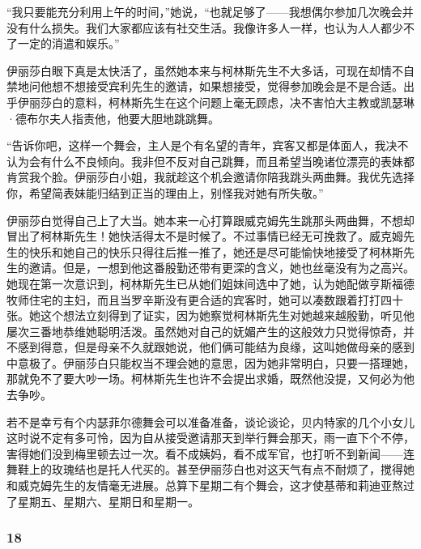 \par “我只要能充分利用上午的时间，”她说，“也就足够了——我想偶尔参加几次晚会并没有什么损失。我们大家都应该有社交生活。我像许多人一样，也认为人人都少不了一定的消遣和娱乐。”
\par 伊丽莎白眼下真是太快活了，虽然她本来与柯林斯先生不大多话，可现在却情不自禁地问他想不想接受宾利先生的邀请，如果想接受，觉得参加晚会是不是合适。出乎伊丽莎白的意料，柯林斯先生在这个问题上毫无顾虑，决不害怕大主教或凯瑟琳·德布尔夫人指责他，他要大胆地跳跳舞。
\par “告诉你吧，这样一个舞会，主人是个有名望的青年，宾客又都是体面人，我决不认为会有什么不良倾向。我非但不反对自己跳舞，而且希望当晚诸位漂亮的表妹都肯赏我个脸。伊丽莎白小姐，我就趁这个机会邀请你陪我跳头两曲舞。我优先选择你，希望简表妹能归结到正当的理由上，别怪我对她有所失敬。”
\par 伊丽莎白觉得自己上了大当。她本来一心打算跟威克姆先生跳那头两曲舞，不想却冒出了柯林斯先生！她快活得太不是时候了。不过事情已经无可挽救了。威克姆先生的快乐和她自己的快乐只得往后推一推了，她还是尽可能愉快地接受了柯林斯先生的邀请。但是，一想到他这番殷勤还带有更深的含义，她也丝毫没有为之高兴。她现在第一次意识到，柯林斯先生已从她们姐妹间选中了她，认为她配做亨斯福德牧师住宅的主妇，而且当罗辛斯没有更合适的宾客时，她可以凑数跟着打打四十张。她这个想法立刻得到了证实，因为她察觉柯林斯先生对她越来越殷勤，听见他屡次三番地恭维她聪明活泼。虽然她对自己的妩媚产生的这般效力只觉得惊奇，并不感到得意，但是母亲不久就跟她说，他们俩可能结为良缘，这叫她做母亲的感到中意极了。伊丽莎白只能权当不理会她的意思，因为她非常明白，只要一搭理她，那就免不了要大吵一场。柯林斯先生也许不会提出求婚，既然他没提，又何必为他去争吵。
\par 若不是幸亏有个内瑟菲尔德舞会可以准备准备，谈论谈论，贝内特家的几个小女儿这时说不定有多可怜，因为自从接受邀请那天到举行舞会那天，雨一直下个不停，害得她们没到梅里顿去过一次。看不成姨妈，看不成军官，也打听不到新闻——连舞鞋上的玫瑰结也是托人代买的。甚至伊丽莎白也对这天气有点不耐烦了，搅得她和威克姆先生的友情毫无进展。总算下星期二有个舞会，这才使基蒂和莉迪亚熬过了星期五、星期六、星期日和星期一。



\subsubsection*{18}

